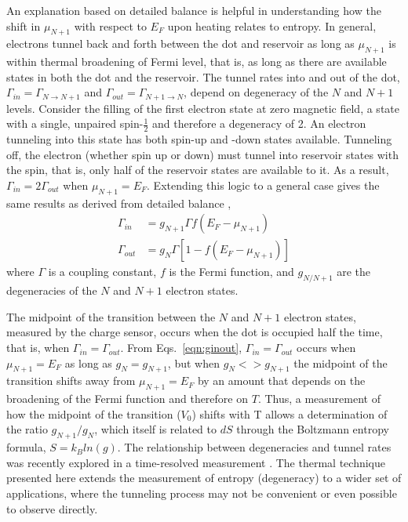 \documentclass[twocolumn,showpacs,preprintnumbers,amsmath,amssymb,pra,aps,superscriptaddress]{revtex4-1}
\begin{document}
An explanation based on detailed balance is helpful in understanding how the shift in $\mu_{N+1}$ with respect to $E_F$ upon heating relates to entropy.   In general, electrons tunnel back and forth between the dot and reservoir as long as $\mu_{N+1}$ is within thermal broadening of Fermi level, that is, as long as there are available states in both the dot and the reservoir.  The tunnel rates into and out of the dot, $\Gamma_{in}=\Gamma_{N\rightarrow N+1}$ and $\Gamma_{out}=\Gamma_{N+1\rightarrow N}$, depend on degeneracy of the $N$ and $N+1$ levels.  Consider the filling of the first electron state at zero magnetic field, a state with a single, unpaired spin-$\frac{1}{2}$ and therefore a degeneracy of 2. An electron tunneling into this state has both spin-up and -down states available.  Tunneling off, the electron (whether spin up or down) must tunnel into reservoir states with the spin, that is, only half of the reservoir states are available to it. As a result, $\Gamma_{in} = 2\Gamma_{out}$ when $\mu_{N+1}=E_F$. Extending this logic to a general case gives the same results as derived from detailed balance \cite{Gustavsson2009}, 
%
\begin{align}
	\Gamma_{in} &=  g_{N+1} \Gamma f(E_F - \mu_{N+1}) \label{eqn:rates}\\
	\Gamma_{out} &= g_{N} \Gamma [1 - f(E_F - \mu_{N+1})] \nonumber
\end{align}
%
where $\Gamma$ is a coupling constant, $f$ is the Fermi function, and $g_{N/N+1}$ are the degeneracies of the $N$ and $N+1$ electron states.

The midpoint of the transition between the $N$ and $N+1$ electron states, measured by the charge sensor, occurs when the dot is occupied half the time, that is, when $\Gamma_{in} = \Gamma_{out}$. From Eqs.~\ref{eqn:ginout}, $\Gamma_{in} = \Gamma_{out}$ occurs when $\mu_{N+1} = E_F$ as long as $g_{N}=g_{N+1}$, but when $g_{N}<>g_{N+1}$ the midpoint of the transition shifts away from $\mu_{N+1}=E_F$ by an amount that depends on the broadening of the Fermi function and therefore on $T$.   Thus, a measurement of how the midpoint of the transition ($V_0$) shifts with T allows a determination of the ratio $g_{N+1}/g_{N}$, which itself is related to $dS$ through the Boltzmann entropy formula, $S=k_B ln(g)$.  The relationship between degeneracies and tunnel rates was recently explored in a time-resolved measurement \cite{Hofmann2016}.  The thermal technique presented here extends the measurement of entropy (degeneracy) to a wider set of applications, where the tunneling process may not be convenient or even possible to observe directly.
\end{document}
